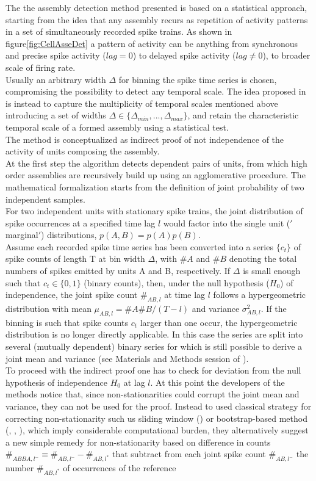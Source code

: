 The the assembly detection method presented is based on a statistical approach, starting from the idea that any assembly recurs as repetition of activity patterns in a set of simultaneously recorded spike trains. As shown in figure\ref{fig:CellAsseDet} a pattern of activity can be anything from synchronous and precise spike activity ($lag = 0$) to delayed spike activity ($lag\neq 0$), to broader scale of firing rate.\\Usually an arbitrary width $\Delta$ for binning the spike time series is chosen, compromising the possibility to detect any temporal scale. The idea proposed in \cite{RussoDurstewitz} is instead to capture the multiplicity of temporal scales mentioned above introducing a set of widths $\Delta \in \{\Delta_{min},...,\Delta_{max}\}$, and retain the characteristic temporal scale of a formed assembly using a statistical test.\\The method is conceptualized as indirect proof of not independence of the activity of units composing the assembly.\\At the first step the algorithm detects dependent pairs of units, from which high order assemblies are recursively build up using an agglomerative procedure. The mathematical formalization starts from the definition of joint probability of two independent samples.\\For two independent units with stationary spike trains, the joint distribution of spike occurrences at a specified time lag $l$ would factor into the single unit ($'$marginal$'$) distributions, $p(A,B)=p(A)p(B)$.\\ Assume each recorded spike time series has been converted into a series $\{c_t\}$ of spike counts of length T at bin width $\Delta$, with $\# A$ and $\# B$ denoting the total numbers of spikes emitted by units A and B, respectively. If $\Delta$ is small enough such that $c_t\in\{0,1\}$ (binary counts), then, under the null hypothesis ($H_0$) of independence, the joint spike count $\#_{AB,l}$ at time lag $l$ follows a hypergeometric distribution with mean $\mu_{AB,l}=\# A \# B/(T-l)$ and variance $\sigma^{2}_{AB,l}$. If the binning is such that spike counts $c_t$ larger than one occur, the hypergeometric distribution is no longer directly applicable. In this case the series are split into several (mutually dependent) binary series for which is still possible to derive a joint mean and variance (see Materials and Methods session of \cite{RussoDurstewitz}).\\To proceed with the indirect proof one has to check for deviation from the null hypothesis of independence $H_0$ at lag $l$. At this point the developers of the methods notice that, since non-stationarities could corrupt the joint mean and variance, they can not be used for the proof. Instead to used classical strategy for correcting non-stationarity such us sliding window (\cite{Gruen}) or bootstrap-based method (\cite{Fujisawa}, \cite{Pipa}, \cite{Picado}), which imply considerable computational burden, they alternatively suggest a new simple remedy for non-stationarity based on difference in counts $\#_{ABBA,l^-} \equiv \#_{AB,l^-} - \#_{AB,l^*}$ that subtract from each joint spike count $\#_ {AB,l^-}$ the number $\#_{AB,l^*}$ of occurrences of the reference 